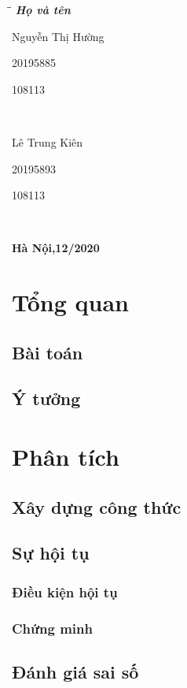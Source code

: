 \documentclass[a4paper]{article}
\begin{document}
\begin{titlepage}
\begin{tabbing}
\hspace{8cm}\=\hspace{3cm}\=\hspace{3cm} \kill
{\it \textbf{Họ và tên}}\\
\begin{bfseries}Nguyễn Thị Hường\end{bfseries}\> \begin{bfseries}20195885\end{bfseries}\> \begin{bfseries}108113\end{bfseries}\\
\begin{bfseries}Lê Trung Kiên\end{bfseries}\> \begin{bfseries}20195893\end{bfseries}\> \begin{bfseries}108113\end{bfseries}\\

\end{tabbing}
\vspace{10pt}
\begin{center}
    \textbf{Hà Nội,12/2020}
\end{center}
\end{titlepage}
\pagestyle{fancy}
\fancyhf{}
\chead{ }
\tableofcontents
\clearpage
\section{Tổng quan}
\subsection{Bài toán}
\subsection{Ý tưởng}
\section{Phân tích}
\subsection{Xây dựng công thức}
\subsection{Sự hội tụ}
\subsubsection{Điều kiện hội tụ}
\subsubsection{Chứng minh}
\subsection{Đánh giá sai số}
\end{document}
